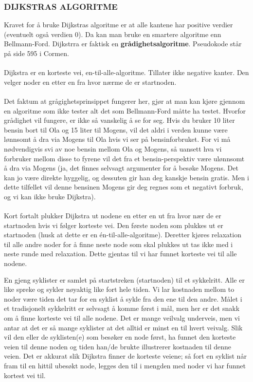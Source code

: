 \subsubsection{DIJKSTRAS ALGORITME}
Kravet for å bruke Dijkstras algoritme er at alle kantene har positive verdier (eventuelt også verdien 0). Da kan man bruke en smartere algoritme enn Bellmann-Ford. Dijkstrra er faktisk en \textbf{grådighetsalgoritme}. Pseudokode står på side 595 i Cormen.
\\\\
Dijkstra er en korteste vei, en-til-alle-algoritme. Tillater ikke negative kanter. Den velger noder en etter en fra hvor nærme de er startnoden. 
\\\\
Det faktum at grågighetsprinsippet fungerer her, gjør at man kan kjøre gjennom en algoritme som ikke tester alt det som Bellmann-Ford måtte ha testet. Hvorfor grådighet vil fungere, er ikke så vanskelig å se for seg. Hvis du bruker 10 liter bensin bort til Ola og 15 liter til Mogens, vil det aldri i verden kunne være lønnsomt å dra via Mogens til Ola hvis vi ser på bensinforbruket. For vi må nødvendigvis svi av noe bensin mellom Ola og Mogens, så uansett hva vi forbruker mellom disse to fyrene vil det fra et bensin-perspektiv være ulønnsomt å dra via Mogens (ja, det finnes selvsagt argumenter for å besøke Mogens. Det kan jo være direkte hyggelig, og dessuten gir han deg kanskje bensin gratis. Men i dette tilfellet vil denne bensinen Mogens gir deg regnes som et negativt forbruk, og vi kan ikke bruke Dijkstra).
\\\\
Kort fortalt plukker Dijkstra ut nodene en etter en ut fra hvor nær de er startnoden hvis vi følger korteste vei. Den første noden som plukkes ut er startnoden (husk at dette er en én-til-alle-algoritme). Deretter kjøres relaxation til alle andre noder for å finne neste node som skal plukkes ut tas ikke med i neste runde med relaxation. Dette gjentas til vi har funnet korteste vei til alle nodene. 

\begin{boxed}
En gjeng syklister er samlet på startstreken (startnoden) til et sykkelritt. Alle er like spreke og sykler nøyaktig like fort hele tiden. Vi lar kostnaden mellom to noder være tiden det tar for en syklist å sykle fra den ene til den andre. Målet i et tradisjonelt sykkelritt er selvsagt å komme først i mål, men her er det snakk om å finne korteste vei til alle nodene.\newline\newline
Det er mange veilvalg underveis, men vi antar at det er så mange syklister at det alltid er minst en til hvert veivalg. Slik vil den eller de syklisten(e) som besøker en node først, ha funnet den korteste veien til denne noden og tiden han/de brukte illustrerer kostnaden til denne veien.
\newline\newline
Det er akkurat slik Dijkstra finner de korteste veiene; så fort en syklist når fram til en hittil ubesøkt node, legges den til i mengden med noder vi har funnet kortest vei til.
\end{boxed}

